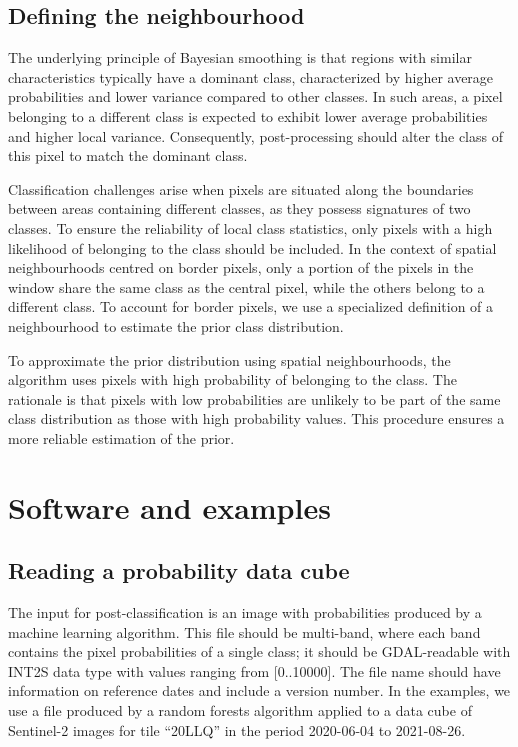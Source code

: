 \documentclass[
  shortnames]{jss}
\begin{document}
\hypertarget{defining-the-neighbourhood}{%
\subsection{Defining the neighbourhood}\label{defining-the-neighbourhood}}

The underlying principle of Bayesian smoothing is that regions with similar characteristics typically have a dominant class, characterized by higher average probabilities and lower variance compared to other classes. In such areas, a pixel belonging to a different class is expected to exhibit lower average probabilities and higher local variance. Consequently, post-processing should alter the class of this pixel to match the dominant class.

Classification challenges arise when pixels are situated along the boundaries between areas containing different classes, as they possess signatures of two classes. To ensure the reliability of local class statistics, only pixels with a high likelihood of belonging to the class should be included. In the context of spatial neighbourhoods centred on border pixels, only a portion of the pixels in the window share the same class as the central pixel, while the others belong to a different class. To account for border pixels, we use a specialized definition of a neighbourhood to estimate the prior class distribution.

To approximate the prior distribution using spatial neighbourhoods, the algorithm uses pixels with high probability of belonging to the class. The rationale is that pixels with low probabilities are unlikely to be part of the same class distribution as those with high probability values. This procedure ensures a more reliable estimation of the prior.

\hypertarget{software-and-examples}{%
\section{Software and examples}\label{software-and-examples}}

\hypertarget{reading-a-probability-data-cube}{%
\subsection{Reading a probability data cube}\label{reading-a-probability-data-cube}}

The input for post-classification is an image with probabilities produced by a machine learning algorithm. This file should be multi-band, where each band contains the pixel probabilities of a single class; it should be GDAL-readable with INT2S data type with values ranging from {[}0..10000{]}. The file name should have information on reference dates and include a version number. In the examples, we use a file produced by a random forests algorithm applied to a data cube of Sentinel-2 images for tile ``20LLQ'' in the period 2020-06-04 to 2021-08-26.
\end{document}
